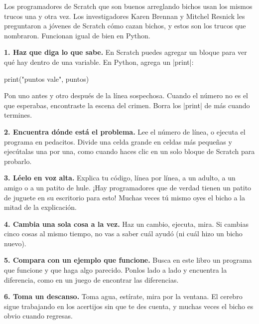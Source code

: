 Los programadores de Scratch que son buenos arreglando bichos usan los mismos trucos una y otra vez. Los investigadores Karen Brennan y Mitchel Resnick les preguntaron a jóvenes de Scratch cómo cazan bichos, y estos son los trucos que nombraron. Funcionan igual de bien en Python.

\textbf{1. Haz que diga lo que sabe.} En Scratch puedes agregar un bloque  para ver qué hay dentro de una variable. En Python, agrega un \py|print|:

\begin{tcbraster}[raster columns=2, raster equal height=rows, raster column skip=12pt, raster valign=center]
\begin{tcolorbox}[colback=white, colframe=white, boxrule=0pt, valign=center]
\begin{scratch}
\end{scratch}
\end{tcolorbox}
\begin{code}
print("puntos vale", puntos)
\end{code}
\end{tcbraster}

Pon uno antes y otro después de la línea sospechosa. Cuando el número no es el que esperabas, encontraste la escena del crimen. Borra los \py|print| de más cuando termines.

\textbf{2. Encuentra dónde está el problema.} Lee el número de línea, o ejecuta el programa en pedacitos. Divide una celda grande en celdas más pequeñas y ejecútalas una por una, como cuando haces clic en un solo bloque de Scratch para probarlo.

\textbf{3. Léelo en voz alta.} Explica tu código, línea por línea, a un adulto, a un amigo o a un patito de hule. ¡Hay programadores que de verdad tienen un patito de juguete en su escritorio para esto! Muchas veces tú mismo oyes el bicho a la mitad de la explicación.

\textbf{4. Cambia una sola cosa a la vez.} Haz un cambio, ejecuta, mira. Si cambias cinco cosas al mismo tiempo, no vas a saber cuál ayudó (ni cuál hizo un bicho nuevo).

\textbf{5. Compara con un ejemplo que funcione.} Busca en este libro un programa que funcione y que haga algo parecido. Ponlos lado a lado y encuentra la diferencia, como en un juego de encontrar las diferencias.

\textbf{6. Toma un descanso.} Toma agua, estírate, mira por la ventana. El cerebro sigue trabajando en los acertijos sin que te des cuenta, y muchas veces el bicho es obvio cuando regresas.

